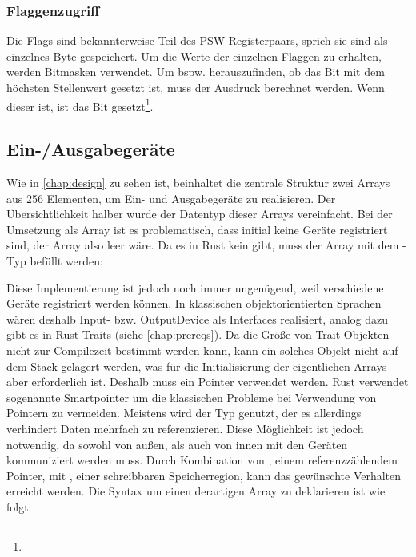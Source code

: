 \subsubsection{Flaggenzugriff}

Die Flags sind bekannterweise Teil des PSW-Registerpaars, sprich sie sind als einzelnes Byte gespeichert. Um die Werte der einzelnen Flaggen zu erhalten, werden Bitmasken verwendet. Um bspw. herauszufinden, ob das Bit mit dem höchsten Stellenwert gesetzt ist, muss der Ausdruck  berechnet werden. Wenn dieser  ist, ist das Bit gesetzt\footnote{}.

\subsection{Ein-/Ausgabegeräte}

Wie in \cref{chap:design} zu sehen ist, beinhaltet die zentrale Struktur zwei Arrays aus 256 Elementen, um Ein- und Ausgabegeräte zu realisieren. Der Übersichtlichkeit halber wurde der Datentyp dieser Arrays vereinfacht. Bei der Umsetzung als Array ist es problematisch, dass initial keine Geräte registriert sind, der Array also leer wäre. Da es in Rust kein  gibt, muss der Array mit dem -Typ befüllt werden:


Diese Implementierung ist jedoch noch immer ungenügend, weil verschiedene Geräte registriert werden können. In klassischen objektorientierten Sprachen wären deshalb Input- bzw. OutputDevice als Interfaces realisiert, analog dazu gibt es in Rust Traits (siehe \cref{chap:prereqs}). Da die Größe von Trait-Objekten nicht zur Compilezeit bestimmt werden kann, kann ein solches Objekt nicht auf dem Stack gelagert werden, was für die Initialisierung der eigentlichen Arrays aber  erforderlich ist. Deshalb muss ein Pointer verwendet werden. Rust verwendet sogenannte \glqq Smartpointer\grqq{} um die klassischen Probleme bei Verwendung von Pointern zu vermeiden. Meistens wird der Typ  genutzt, der es allerdings verhindert Daten mehrfach zu referenzieren. Diese Möglichkeit ist jedoch notwendig, da sowohl von außen, als auch von innen mit den Geräten kommuniziert werden muss. Durch Kombination von , einem referenzzählendem Pointer, mit , einer schreibbaren Speicherregion, kann das gewünschte Verhalten erreicht werden. Die Syntax um einen derartigen Array zu deklarieren ist wie folgt:

